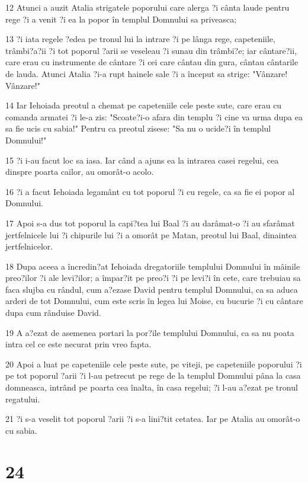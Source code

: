 \par 12 Atunci a auzit Atalia strigatele poporului care alerga ?i cânta laude pentru rege ?i a venit ?i ea la popor în templul Domnului sa priveasca;
\par 13 ?i iata regele ?edea pe tronul lui la intrare ?i pe lânga rege, capeteniile, trâmbi?a?ii ?i tot poporul ?arii se veseleau ?i sunau din trâmbi?e; iar cântare?ii, care erau cu instrumente de cântare ?i cei care cântau din gura, cântau cântarile de lauda. Atunci Atalia ?i-a rupt hainele sale ?i a început sa strige: "Vânzare! Vânzare!"
\par 14 Iar Iehoiada preotul a chemat pe capeteniile cele peste sute, care erau cu comanda armatei ?i le-a zis: "Scoate?i-o afara din templu ?i cine va urma dupa ea sa fie ucis cu sabia!" Pentru ca preotul zisese: "Sa nu o ucide?i în templul Domnului!"
\par 15 ?i i-au facut loc sa iasa. Iar când a ajuns ea la intrarea casei regelui, cea dinspre poarta cailor, au omorât-o acolo.
\par 16 ?i a facut Iehoiada legamânt cu tot poporul ?i cu regele, ca sa fie ei popor al Domnului.
\par 17 Apoi s-a dus tot poporul la capi?tea lui Baal ?i au darâmat-o ?i au sfarâmat jertfelnicele lui ?i chipurile lui ?i a omorât pe Matan, preotul lui Baal, dinaintea jertfelnicelor.
\par 18 Dupa aceea a încredin?at Iehoiada dregatoriile templului Domnului în mâinile preo?ilor ?i ale levi?ilor; a împar?it pe preo?i ?i pe levi?i în cete, care trebuiau sa faca slujba cu rândul, cum a?ezase David pentru templul Domnului, ca sa aduca arderi de tot Domnului, cum este scris în legea lui Moise, cu bucurie ?i cu cântare dupa cum rânduise David.
\par 19 A a?ezat de asemenea portari la por?ile templului Domnului, ca sa nu poata intra cel ce este necurat prin vreo fapta.
\par 20 Apoi a luat pe capeteniile cele peste sute, pe viteji, pe capeteniile poporului ?i pe tot poporul ?arii ?i l-au petrecut pe rege de la templul Domnului pâna la casa domneasca, intrând pe poarta cea înalta, în casa regelui; ?i l-au a?ezat pe tronul regatului.
\par 21 ?i s-a veselit tot poporul ?arii ?i s-a lini?tit cetatea. Iar pe Atalia au omorât-o cu sabia.

\chapter{24}

